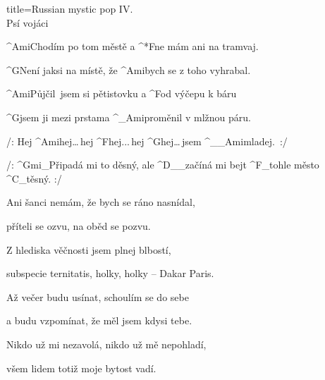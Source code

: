 \begin{song}{title=\predtitle\centering Russian mystic pop IV. \\\large Psí vojáci  \vspace*{-0.3cm}}  %
\begin{centerjustified}
\nejnejvetsi

\sloka 
	^{Ami\z}Chodím po tom městě a ^*{F\:}ne mám ani na tramvaj.

	^{G\z}Není jaksi na místě, že ^{Ami}bych se z toho vyhrabal.

	^{Ami\z}Půjčil~jsem si pětistovku a ^{F}od výčepu k báru

	^{G}jsem ji mezi prstama ^{{\color{white}\_}Ami}proměnil v mlžnou páru.

	/: Hej ^{Ami\phantom{dddd}}hej\elipsa\dots\,hej ^{F\phantom{dddd}}hej\elipsa.\elipsa.\elipsa.\,hej ^{G\phantom{dddddd}}hej\elipsa\dots\,jsem ^{{\color{white}\_\_}Ami\:\:}mladej.~:/

	 /: ^{Gmi{\color{white}\_}}Připadá mi to děsný, ale ^{D{\color{white}\_\_}}začíná mi bejt ^{F{\color{white}\_}}tohle město ^{C{\color{white}\_}}těsný. :/

\sloka
	Ani šanci nemám, že bych se ráno nasnídal,

	příteli se ozvu, na oběd se pozvu.

	Z hlediska věčnosti jsem plnej blbostí,

	subspecie ternitatis, holky, holky -- Dakar Paris.


\sloka
	Až večer budu usínat, schoulím se do sebe

	a budu vzpomínat, že měl jsem kdysi tebe.

	Nikdo už mi nezavolá, nikdo už mě nepohladí,

	všem lidem totiž moje bytost vadí.


\end{centerjustified}
\setcounter{Slokočet}{0}
\end{song}
